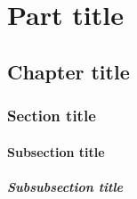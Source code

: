 \documentclass[english,counters by chapter]{uniud}
\begin{document}

\frontmatter

\maketitle

\begin{acknowledgements}

\blindtext

\end{acknowledgements}

\begin{abstract}

\blindtext

\end{abstract}

\tableofcontents*


\mainmatter


\part{Part title}

\chapter{Chapter title}
\blindmathtrue

\blindtext

\section{Section title}

\blindtext

\subsection{Subsection title}

\blindtext

\subsubsection{Subsubsection title}
\end{document}
